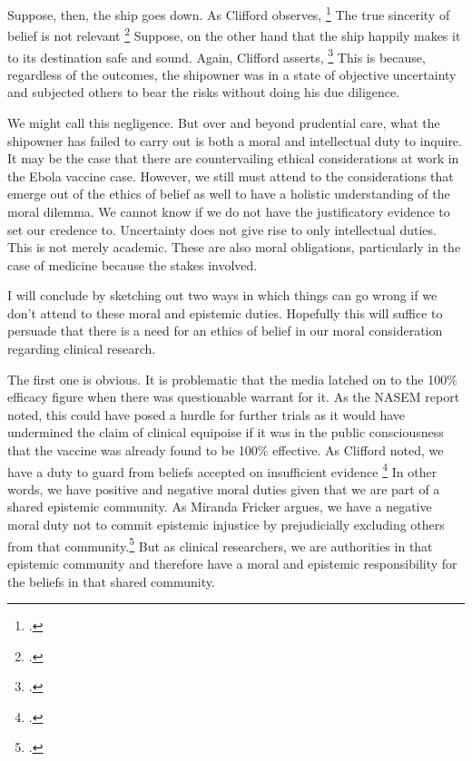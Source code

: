 \documentclass[letterpaper,notitlepage,12pt]{article}
\begin{document}
Suppose, then, the ship goes down.
As Clifford observes, \footcite{Clifford 1877 339}
The true sincerity of belief is not relevant \footcite{Clifford
  340}
Suppose, on the other hand that the ship happily makes it to its destination
safe and sound.
Again, Clifford asserts, \footcite{340}
This is because, regardless of the outcomes, the shipowner was in a state of
objective uncertainty and subjected others to bear the risks without
doing his due diligence.

We might call this negligence.
But over and beyond prudential care, what the shipowner has failed to carry out
is both a moral and intellectual duty to inquire.
It may be the case that there are countervailing ethical considerations at work
in the Ebola vaccine case.
However, we still must attend to the considerations that emerge out of the
ethics of belief as well to have a holistic understanding of the moral dilemma.
We cannot know if we do not have the justificatory evidence to set our credence
to.
Uncertainty does not give rise to only intellectual duties.
This is not merely academic.
These are also moral obligations, particularly in the case of medicine because
the stakes involved.

I will conclude by sketching out two ways in which things can go wrong if we
don't attend to these moral and epistemic duties.
Hopefully this will suffice to persuade that there is a need for an ethics of
belief in our moral consideration regarding clinical research.

The first one is obvious.
It is problematic that the media latched on to the 100\% efficacy figure when
there was questionable warrant for it.
As the NASEM report noted, this could have posed a hurdle for further
trials as it would have undermined the claim of clinical equipoise if it was in
the public consciousness that the vaccine was already found to be 100\%
effective.
As Clifford noted, we have a duty to guard from beliefs accepted on insufficient
evidence \footcite{344}
In other words, we have positive and negative moral duties given that we are
part of a shared epistemic community.
As Miranda Fricker argues, we have a negative moral duty not to commit epistemic
injustice by prejudicially excluding others from that
community.\footcite{fricker}
But as clinical researchers, we are authorities in that epistemic community and
therefore have a moral and epistemic responsibility for the beliefs in that
shared community.
\end{document}
